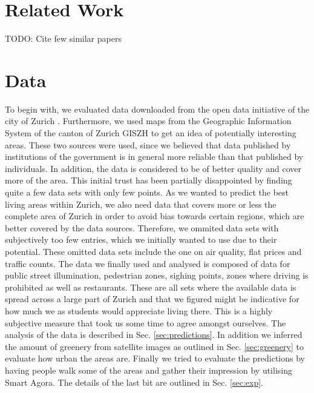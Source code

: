 \documentclass[letterpaper]{article}
\begin{document}
\section{Related Work}
TODO: Cite few similar papers

\section{Data}\label{sec:data}
To begin with, we evaluated data downloaded from the open data initiative of the city of Zurich \cite{ZurichOD}. 
Furthermore, we used maps from the Geographic Information System of the canton of Zurich GISZH \cite{GISZH} to get 
an idea of potentially interesting areas.
These two sources were used, since we believed that data published by institutions of the government is in general 
more reliable than that published by individuals. In addition, the data is considered to be of better quality and 
cover more of the area. This initial trust has been partially disappointed by finding quite a few data sets with only few points.
As we wanted to predict the best living areas within Zurich, we also need data that covers more or less the complete area of Zurich
in order to avoid bias towards certain regions, which are better covered by the data sources. Therefore, we ommited data sets 
with subjectively too few entries, which we initially wanted to use due to their potential. These omitted data sets include 
the one on air quality, flat prices and traffic counts.
The data we finally used and analysed is composed of data for public street illumination, pedestrian zones, sighing points, 
zones where driving is prohibited as well as restaurants. These are all sets where the available data is spread across 
a large part of Zurich and that we figured might be indicative for how much we as students would appreciate living there. 
This is a highly subjective measure that took us some time to agree amongst ourselves.
The analysis of the data is described in Sec. \ref{sec:predictions}. In addition we inferred the amount of greenery from satellite 
images as outlined in Sec. \ref{sec:greenery} to evaluate how urban the areas are. Finally we tried to evaluate the predictions 
by having people walk some of the areas and gather their impression by utilising Smart Agora. The details of the last bit 
are outlined in Sec. \ref{sec:exp}.
\end{document}
